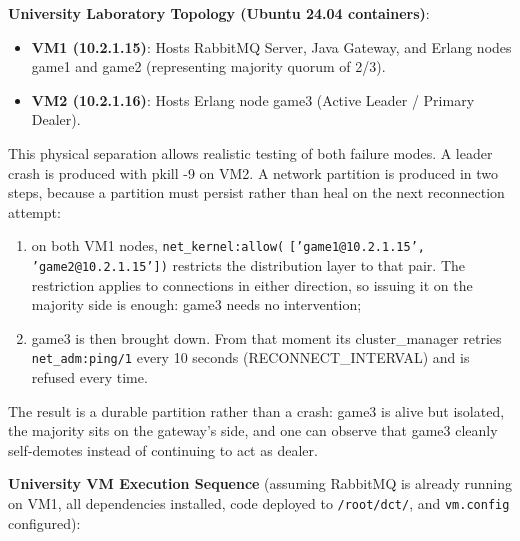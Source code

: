 \documentclass[12pt,a4paper]{article}
\begin{document}
\textbf{University Laboratory Topology (Ubuntu 24.04 containers)}:
\begin{itemize}
    \item \textbf{VM1 (10.2.1.15)}: Hosts RabbitMQ Server, Java Gateway, and Erlang nodes game1 and game2 (representing majority quorum of 2/3).
    \item \textbf{VM2 (10.2.1.16)}: Hosts Erlang node game3 (Active Leader / Primary Dealer).
\end{itemize}

This physical separation allows realistic testing of both failure modes. A leader crash is produced with pkill -9 on VM2. A network partition is produced in two steps, because a partition must persist rather than heal on the next reconnection attempt:
\begin{enumerate}
    \item on both VM1 nodes, \texttt{net\_\allowbreak kernel:allow(} \allowbreak \texttt{['game1@10.2.1.15',} \allowbreak \texttt{'game2@10.2.1.15'])} restricts the distribution layer to that pair. The restriction applies to connections in either direction, so issuing it on the majority side is enough: game3 needs no intervention;
    \item game3 is then brought down. From that moment its cluster\_\allowbreak manager retries \texttt{net\_\allowbreak adm:ping/1} every 10 seconds (RECONNECT\_\allowbreak INTERVAL) and is refused every time.
\end{enumerate}
The result is a durable partition rather than a crash: game3 is alive but isolated, the majority sits on the gateway's side, and one can observe that game3 cleanly self-demotes instead of continuing to act as dealer.

\clearpage
\textbf{University VM Execution Sequence} (assuming RabbitMQ is already running on VM1, all dependencies installed, code deployed to \texttt{/root/dct/}, and \texttt{vm.config} configured):
\end{document}
